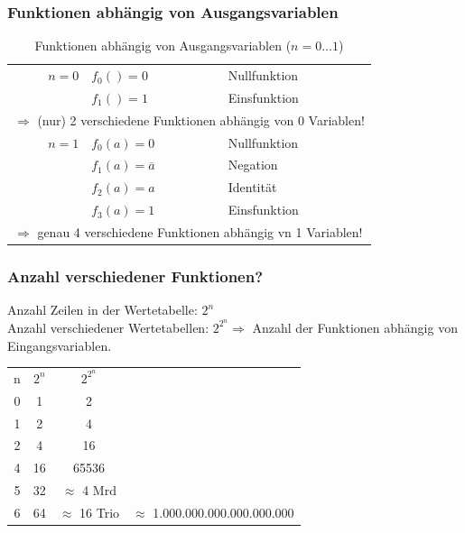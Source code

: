 \documentclass[10pt,a4paper]{scrartcl}
\begin{document}
\subsubsection{Funktionen abhängig von Ausgangsvariablen}
\begin{table}[h]
	\centering
	\begin{tabular}{|r|l|l|}
	\hline
	$ n = 0 $ & $ f_0() = 0 $ & \glqq Nullfunktion\grqq \\
					 & $ f_1() = 1 $ & \glqq Einsfunktion\grqq \\ \hline
\multicolumn{3}{|l|}{$ \Rightarrow $ (nur) 2 verschiedene Funktionen abhängig von 0 Variablen!}\\ \hline
	$ n = 1 $ & $ f_0(a) = 0 $ & \glqq Nullfunktion\grqq \\
					 & $ f_1(a) = \overline{a} $ & \glqq Negation \grqq \\
					 & $ f_2(a) = a $ & \glqq Identität \grqq \\
					 & $ f_3(a) = 1 $ & \glqq Einsfunktion \grqq \\ \hline
 \multicolumn{3}{|l|}{$ \Rightarrow $ genau 4 verschiedene Funktionen abhängig vn 1 Variablen!}\\ \hline
\end{tabular}
\label{tab:funktionenausgang}
\caption{Funktionen abhängig von Ausgangsvariablen ($ n = 0 \ldots 1 $)}
\end{table}

\subsubsection*{Anzahl verschiedener Funktionen?}
Anzahl Zeilen in der Wertetabelle: $ 2^n $\\
Anzahl verschiedener Wertetabellen: $ 2^{2^{n}} \Rightarrow $ Anzahl der Funktionen abhängig von Eingangsvariablen.
\\
\begin{minipage}{0.45\textwidth}
	\begin{tabular}{cccl}
		n & $ 2^n $ & $ 2^{2^{n}} $& \\ \cline{1-3}
		0 & 1 & 2 &\\
		1 & 2 & 4 &\\
		2 & 4 & 16&\\
		4 & 16 & 65536&\\
		5 & 32 & $ \approx $ 4 Mrd&\\
		6 & 64 & $ \approx $ 16 Trio & $ \approx $ 1.000.000.000.000.000.000
	\end{tabular}
\end{minipage}
\begin{minipage}{0.45\textwidth}
\end{minipage}
\end{document}
